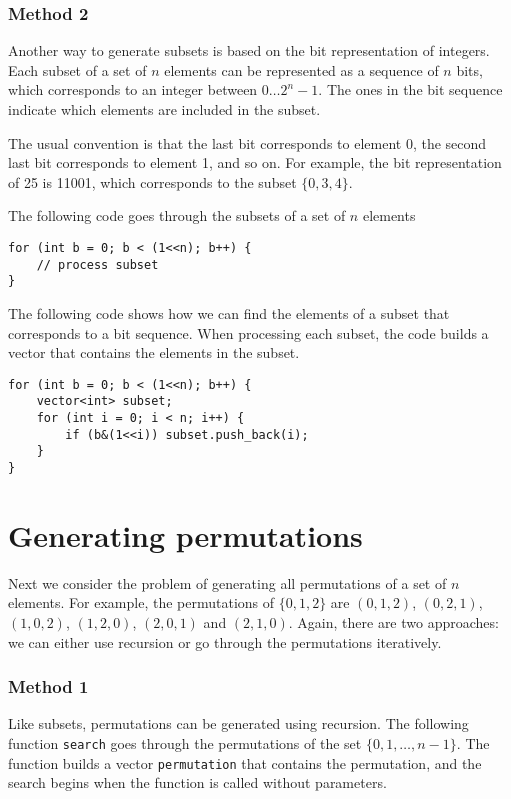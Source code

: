\subsubsection{Method 2}

Another way to generate subsets is based on
the bit representation of integers.
Each subset of a set of $n$ elements
can be represented as a sequence of $n$ bits,
which corresponds to an integer between $0 \ldots 2^n-1$.
The ones in the bit sequence indicate
which elements are included in the subset.

The usual convention is that
the last bit corresponds to element 0,
the second last bit corresponds to element 1,
and so on.
For example, the bit representation of 25
is 11001, which corresponds to the subset $\{0,3,4\}$.

The following code goes through the subsets
of a set of $n$ elements

\begin{lstlisting}
for (int b = 0; b < (1<<n); b++) {
    // process subset
}
\end{lstlisting}

The following code shows how we can find
the elements of a subset that corresponds to a bit sequence.
When processing each subset,
the code builds a vector that contains the
elements in the subset.

\begin{lstlisting}
for (int b = 0; b < (1<<n); b++) {
    vector<int> subset;
    for (int i = 0; i < n; i++) {
        if (b&(1<<i)) subset.push_back(i);
    }
}
\end{lstlisting}

\section{Generating permutations}


Next we consider the problem of generating
all permutations of a set of $n$ elements.
For example, the permutations of $\{0,1,2\}$ are
$(0,1,2)$, $(0,2,1)$, $(1,0,2)$, $(1,2,0)$,
$(2,0,1)$ and $(2,1,0)$.
Again, there are two approaches:
we can either use recursion or go through the
permutations iteratively.

\subsubsection{Method 1}

Like subsets, permutations can be generated
using recursion.
The following function \texttt{search} goes
through the permutations of the set $\{0,1,\ldots,n-1\}$.
The function builds a vector \texttt{permutation}
that contains the permutation,
and the search begins when the function is
called without parameters.

